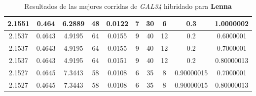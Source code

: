 \begin{table}[h!]
\begin{center}
\begin{tabular}{|c|c|c|c|c|c|c|c|c|c|}
        \hline
        \hline
            2.1551 & 0.464  & 6.2889 & 48 & 0.0122 & 7 & 30 & 6 & 0.3 & 1.0000002\\
        \hline
        \hline
            2.1537 & 0.4643  & 4.9195 & 64 & 0.0155 & 9 & 40 & 12 & 0.2 & 0.6000001\\
        \hline
        \hline
            2.1537 & 0.4643  & 4.9195 & 64 & 0.0155 & 9 & 40 & 12 & 0.2 & 0.7000001\\
        \hline
        \hline
            2.1537 & 0.4643  & 4.9195 & 64 & 0.0151 & 9 & 40 & 12 & 0.2 & 0.80000013\\
        \hline
        \hline
            2.1527 & 0.4645  & 7.3443 & 58 & 0.0108 & 6 & 35 & 8 & 0.90000015 & 0.7000001\\
        \hline
        \hline
            2.1527 & 0.4645  & 7.3443 & 58 & 0.0108 & 6 & 35 & 8 & 0.90000015 & 0.80000013\\
        \hline
        \end{tabular}
        \caption{Resultados de las mejores corridas de \emph{GAL34} hibridado para {\bf Lenna}}
        \label{tb:tableGAL34}
    \end{center}
\end{table}
